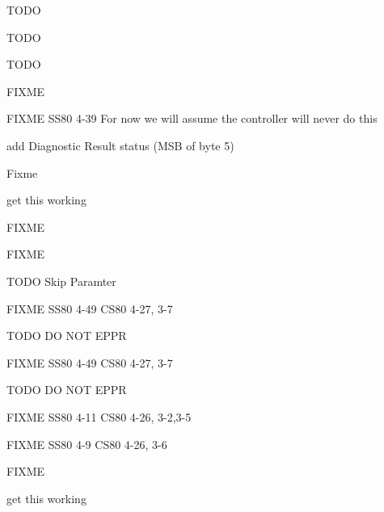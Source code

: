 \begin{DoxyRefList}
\label{todo__todo000029}%
%
T\+O\+DO 

\label{todo__todo000030}%
%
T\+O\+DO 

\label{todo__todo000031}%
%
T\+O\+DO  
\item[Global \mbox{\hyperlink{ss80_8h_a46587aecd8aff545fb96ef5b308f28ff}{S\+S80\+\_\+init}} (void)]\label{todo__todo000010}%
%
F\+I\+X\+ME  
\item[Global \mbox{\hyperlink{ss80_8h_acad6de863f4566b55cb8860eb1ffd09c}{S\+S80\+\_\+locate\+\_\+and\+\_\+read}} (void)]\label{todo__todo000011}%
%
F\+I\+X\+ME S\+S80 4-\/39 For now we will assume the controller will never do this  
\item[Global \mbox{\hyperlink{ss80_8h_ac4c1287b3b8b6a51f5b79522c62d4cea}{S\+S80\+\_\+send\+\_\+status}} (void)]\label{todo__todo000012}%
%
add Diagnostic Result status (M\+SB of byte 5) 

\label{todo__todo000013}%
%
Fixme  
\item[Global \mbox{\hyperlink{ss80_8h_af50a313d8234d38511925a0ca5a9a8a3}{S\+S80\+\_\+\+Test}} (void)]\label{todo__todo000009}%
%
get this working  
\item[Global \mbox{\hyperlink{ss80_8h_a00d10ca5d1cb70d035927df06e90d36c}{S\+S80\+\_\+\+Transparent\+\_\+\+State}} (void)]\label{todo__todo000032}%
%
F\+I\+X\+ME 

\label{todo__todo000033}%
%
F\+I\+X\+ME 

\label{todo__todo000034}%
%
T\+O\+DO Skip Paramter 

\label{todo__todo000035}%
%
F\+I\+X\+ME S\+S80 4-\/49 C\+S80 4-\/27, 3-\/7 

\label{todo__todo000036}%
%
T\+O\+DO DO N\+OT E\+P\+PR 

\label{todo__todo000037}%
%
F\+I\+X\+ME S\+S80 4-\/49 C\+S80 4-\/27, 3-\/7 

\label{todo__todo000038}%
%
T\+O\+DO DO N\+OT E\+P\+PR 

\label{todo__todo000039}%
%
F\+I\+X\+ME S\+S80 4-\/11 C\+S80 4-\/26, 3-\/2,3-\/5 

\label{todo__todo000040}%
%
F\+I\+X\+ME S\+S80 4-\/9 C\+S80 4-\/26, 3-\/6  
\item[Global \mbox{\hyperlink{ss80_8h_ac8a4c5dcd550e896c1e7cec68d2f70e5}{S\+S80\+\_\+\+Universal\+\_\+\+Device\+\_\+\+Clear}} (void)]\label{todo__todo000045}%
%
F\+I\+X\+ME  
\item[Global \mbox{\hyperlink{ss80_8c_a239f4cd0f1360dbfd90fa043d1323e67}{TD}} \mbox{[}\mbox{]}]\label{todo__todo000008}%
%
get this working 
\end{DoxyRefList}